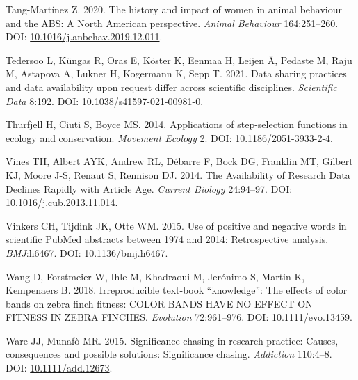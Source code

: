 \documentclass[10pt,a4paper]{article}
\newlength{\cslhangindent}
\newlength{\cslentryspacingunit} %
\newenvironment{CSLReferences}[2] %
 {%
  \setlength{\parindent}{0pt}
  \ifodd #1
  \let\oldpar\par
  \def\par{\hangindent=\cslhangindent\oldpar}
  \fi
  \setlength{\parskip}{#2\cslentryspacingunit}
 }%
 {}
\begin{document}
\begin{CSLReferences}{1}{0}
\leavevmode{}%
Tang-Martínez Z. 2020. The history and impact of women in animal behaviour and the {ABS}: A {North} {American} perspective. \emph{Animal Behaviour} 164:251--260. DOI: \href{https://doi.org/10.1016/j.anbehav.2019.12.011}{10.1016/j.anbehav.2019.12.011}.

\leavevmode{}%
Tedersoo L, Küngas R, Oras E, Köster K, Eenmaa H, Leijen Ä, Pedaste M, Raju M, Astapova A, Lukner H, Kogermann K, Sepp T. 2021. Data sharing practices and data availability upon request differ across scientific disciplines. \emph{Scientific Data} 8:192. DOI: \href{https://doi.org/10.1038/s41597-021-00981-0}{10.1038/s41597-021-00981-0}.

\leavevmode{}%
Thurfjell H, Ciuti S, Boyce MS. 2014. Applications of step-selection functions in ecology and conservation. \emph{Movement Ecology} 2. DOI: \href{https://doi.org/10.1186/2051-3933-2-4}{10.1186/2051-3933-2-4}.

\leavevmode{}%
Vines TH, Albert AYK, Andrew RL, Débarre F, Bock DG, Franklin MT, Gilbert KJ, Moore J-S, Renaut S, Rennison DJ. 2014. The {Availability} of {Research} {Data} {Declines} {Rapidly} with {Article} {Age}. \emph{Current Biology} 24:94--97. DOI: \href{https://doi.org/10.1016/j.cub.2013.11.014}{10.1016/j.cub.2013.11.014}.

\leavevmode{}%
Vinkers CH, Tijdink JK, Otte WM. 2015. Use of positive and negative words in scientific {PubMed} abstracts between 1974 and 2014: Retrospective analysis. \emph{BMJ}:h6467. DOI: \href{https://doi.org/10.1136/bmj.h6467}{10.1136/bmj.h6467}.

\leavevmode{}%
Wang D, Forstmeier W, Ihle M, Khadraoui M, Jerónimo S, Martin K, Kempenaers B. 2018. Irreproducible text-book {``knowledge''}: {The} effects of color bands on zebra finch fitness: {COLOR} {BANDS} {HAVE} {NO} {EFFECT} {ON} {FITNESS} {IN} {ZEBRA} {FINCHES}. \emph{Evolution} 72:961--976. DOI: \href{https://doi.org/10.1111/evo.13459}{10.1111/evo.13459}.

\leavevmode{}%
Ware JJ, Munafò MR. 2015. Significance chasing in research practice: Causes, consequences and possible solutions: {Significance} chasing. \emph{Addiction} 110:4--8. DOI: \href{https://doi.org/10.1111/add.12673}{10.1111/add.12673}.


\end{CSLReferences}
\end{document}
